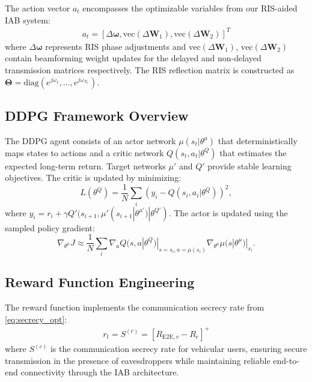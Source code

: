 The action vector $a_t$ encompasses the optimizable variables from our RIS-aided IAB system:
\begin{align}
a_t = [\Delta\boldsymbol{\omega}, \text{vec}(\Delta\mathbf{W}_{1}), \text{vec}(\Delta\mathbf{W}_{2})]^T
\end{align}
where $\Delta\boldsymbol{\omega}$ represents RIS phase adjustments and $\text{vec}(\Delta\mathbf{W}_{1})$, $\text{vec}(\Delta\mathbf{W}_{2})$ contain beamforming weight updates for the delayed and non-delayed transmission matrices respectively. The RIS reflection matrix is constructed as $\boldsymbol{\Theta} = \text{diag}(e^{j\omega_1}, \ldots, e^{j\omega_{N_r}})$.

\subsection{DDPG Framework Overview}

The DDPG agent consists of an actor network $\mu(s_t | \theta^{\mu})$ that deterministically maps states to actions and a critic network $Q(s_t, a_t | \theta^Q)$ that estimates the expected long-term return. Target networks $\mu'$ and $Q'$ provide stable learning objectives. The critic is updated by minimizing:
\begin{equation}
    L(\theta^Q) = \frac{1}{N} \sum_i (y_i - Q(s_i, a_i | \theta^Q))^2,
\end{equation}
where $y_i = r_i + \gamma Q'(s_{i+1}, \mu'(s_{i+1} | \theta^{\mu'}) | \theta^{Q'})$. The actor is updated using the sampled policy gradient:
\begin{equation}
    \nabla_{\theta^{\mu}} J \approx \frac{1}{N} \sum_i \nabla_{a} Q(s, a | \theta^Q)|_{s=s_i, a=\mu(s_i)} \nabla_{\theta^\mu} \mu(s | \theta^\mu)|_{s_i}.
\end{equation}

\subsection{Reward Function Engineering}

The reward function implements the communication secrecy rate from \eqref{eq:secrecy_opt}:
\begin{align}
r_t = S^{(c)} = \left[ R_{\text{E2E},v} - R_e \right]^+
\end{align}
where $S^{(c)}$ is the communication secrecy rate for vehicular users, ensuring secure transmission in the presence of eavesdroppers while maintaining reliable end-to-end connectivity through the IAB architecture.

